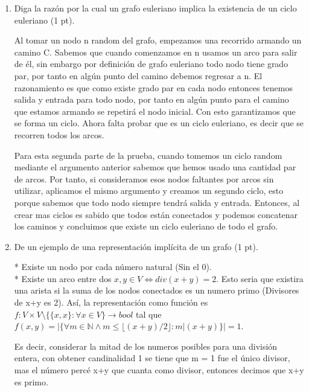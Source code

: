 \documentclass[a4paper,12pt]{article}
\begin{document}
\begin{enumerate}

\item Diga la razón por la cual un grafo euleriano implica la existencia de un ciclo euleriano (1 pt).

\begin{flushleft}
Al tomar un nodo n random del grafo, empezamos una recorrido armando un camino C. Sabemos que cuando comenzamos en n usamos un arco para salir de él, sin embargo por definición de grafo euleriano todo nodo tiene grado par, por tanto en algún punto del camino debemos regresar a n. El razonamiento es que como existe grado par en cada nodo entonces tenemos salida y entrada para todo nodo, por tanto en algún punto para el camino que estamos armando se repetirá el nodo inicial. Con esto garantizamos que se forma un ciclo. Ahora falta probar que es un ciclo euleriano, es decir que se recorren todos los arcos.

Para esta segunda parte de la prueba, cuando tomemos un ciclo random mediante el argumento anterior sabemos que hemos usado una cantidad par de arcos. Por tanto, si consideramos esos nodos faltantes por arcos sin utilizar, aplicamos el mismo argumento y creamos un segundo ciclo, esto porque sabemos que todo nodo siempre tendrá salida y entrada. Entonces, al crear mas ciclos es sabido que todos están conectados y podemos concatenar los caminos y concluimos que existe un ciclo euleriano de todo el grafo. 

\end{flushleft}

\item De un ejemplo de una representación implícita de un grafo (1 pt).

\begin{flushleft}
* Existe un nodo por cada número natural (Sin el 0).\\
* Existe un arco entre dos $x,y \in V \iff div(x+y)=2$. Esto seria que existira una arista si la suma de los nodos conectados es un numero primo (Divisores de x+y es 2). Así, la representación como función es $f: V \times V \setminus \{\{x,x\}: \forall x \in V \} \to bool$ tal que $f(x,y) = |\{ \forall m \in \mathbb{N} \land m \leq \lfloor (x+y)/2 \rfloor : m|(x+y) \}| = 1$. 

Es decir, considerar la mitad de los numeros posibles para una división entera, con obtener candinalidad 1 se tiene que m = 1 fue el único divisor, mas el número percé x+y que cuanta como divisor, entonces decimos que x+y es primo.
\end{flushleft}
$~~$ \\
$~~$ \\
$~~$ \\
$~~$ \\


\end{enumerate}
\end{document}
